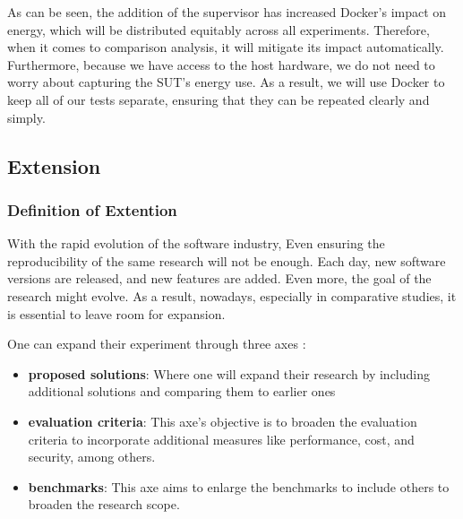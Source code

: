 As can be seen, the addition of the supervisor has increased Docker's impact on energy, which will be distributed equitably across all experiments.
Therefore, when it comes to comparison analysis, it will mitigate its impact automatically.
Furthermore, because we have access to the host hardware, we do not need to worry about capturing the SUT's energy use.
As a result, we will use Docker to keep all of our tests separate, ensuring that they can be repeated clearly and simply.

\subsection{Extension}
\subsubsection{Definition of Extention}
With the rapid evolution of the software industry, Even ensuring the reproducibility of the same research will not be enough.
Each day, new software versions are released, and new features are added. Even more, the goal of the research might evolve. As a result, nowadays, especially in comparative studies, it is essential to leave room for expansion.

One can expand their experiment through three axes :
\begin{itemize}
    \item \textbf{proposed solutions}: Where one will expand their research by including additional solutions and comparing them to earlier ones
    \item \textbf{evaluation criteria}: This axe's objective is to broaden the evaluation criteria to incorporate additional measures like performance, cost, and security, among others.
    \item \textbf{benchmarks}: This axe aims to enlarge the benchmarks to include others to broaden the research scope.
\end{itemize}

